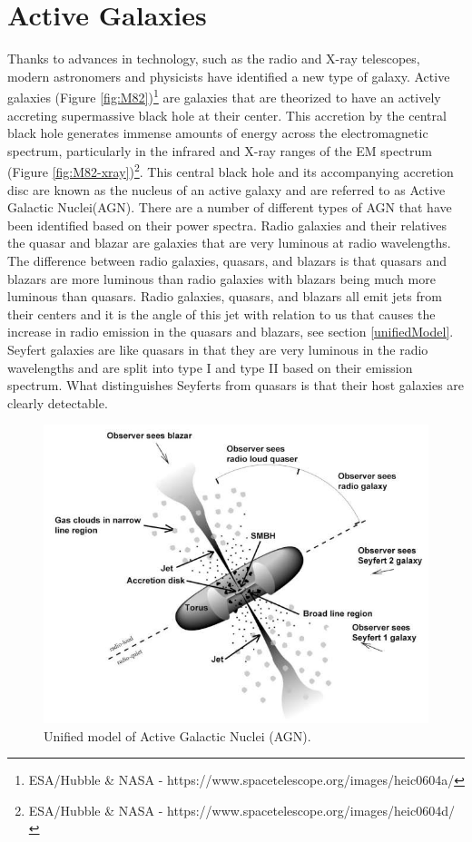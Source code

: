 \documentclass[12pt, oneside]{smuthesis}
\begin{document}
\section{\sc Active Galaxies} \label{activeGalaxies}

Thanks to advances in technology, such as the radio and X-ray telescopes, modern astronomers and physicists have identified a new type of galaxy. Active galaxies (Figure \ref{fig:M82})\footnote{ESA/Hubble \& NASA - https://www.spacetelescope.org/images/heic0604a/} are galaxies that are theorized to have an actively accreting supermassive black hole at their center. This accretion by the central black hole generates immense amounts of energy across the electromagnetic spectrum, particularly in the infrared and X-ray ranges of the EM spectrum (Figure \ref{fig:M82-xray})\footnote{ESA/Hubble \& NASA - https://www.spacetelescope.org/images/heic0604d/}. This central black hole and its accompanying accretion disc are known as the nucleus of an active galaxy and are referred to as Active Galactic Nuclei(AGN). There are a number of different types of AGN that have been identified based on their power spectra. Radio galaxies and their relatives the quasar and blazar are galaxies that are very luminous at radio wavelengths. The difference between radio galaxies, quasars, and blazars is that quasars and blazars are more luminous than radio galaxies with blazars being much more luminous than quasars. Radio galaxies, quasars, and blazars all emit jets from their centers and it is the angle of this jet with relation to us that causes the increase in radio emission in the quasars and blazars, see section \ref{unifiedModel}. Seyfert galaxies are like quasars in that they are very luminous in the radio wavelengths and are split into type I and type II based on their emission spectrum. What distinguishes Seyferts from quasars is that their host galaxies are clearly detectable.

\begin{figure}[H]
	\centering
	\includegraphics[width=0.6\linewidth]{UnifiedModel}
	\caption{Unified model of Active Galactic Nuclei (AGN).}
	\label{fig:unifiedModel}
\end{figure}
\end{document}
